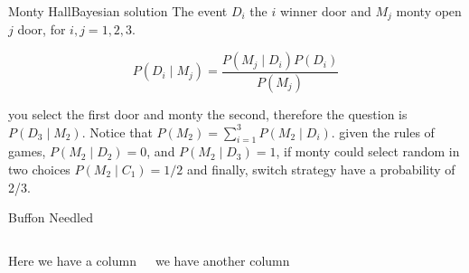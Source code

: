 \documentclass{beamer}
\begin{document}
\begin{frame}{Monty Hall}{Bayesian solution}
The event $D_{i}$ the $i$ winner door and  $M_{j}$ monty open $j$ door, for $i,j=1,2,3$.

\begin{equation}
P(D_{i} \mid M_{j}) = \frac{P(M_{j} \mid D_{i})P(D_{i})}{P(M_{j})}
\end{equation}

you select the first door  and monty the second, therefore the question  is $P(D_{3} \mid M_{2})$.
Notice that $ P(M_{2}) = \sum_{i=1}^{3} P(M_{2} \mid D_{i}) $.  
given the rules of games, 
$P(M_{2} \mid D_{2}) = 0$, and 
$P(M_{2} \mid D_{3}) = 1$, if monty could select random in two choices $P(M_{2} \mid C_{1})=1/2$ and finally, switch strategy have a probability of 2/3.
\end{frame}






\begin{frame}{Buffon Needled}
\begin{columns}

Here we have a column



we have another column


\end{columns}

\end{frame}
\end{document}
